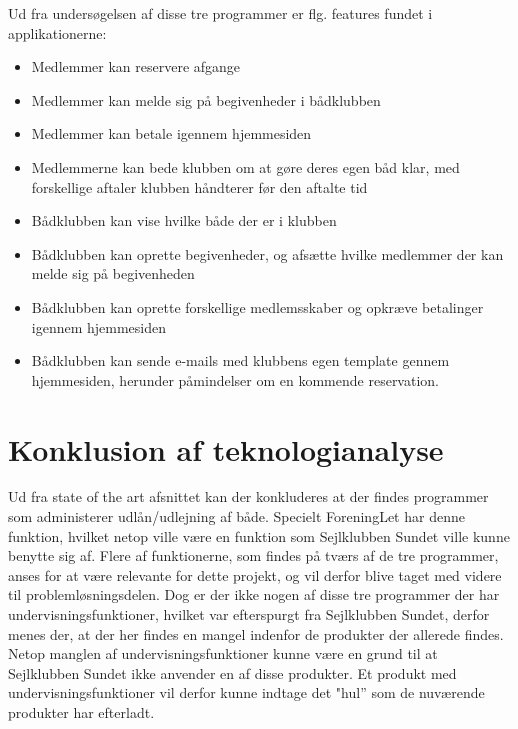Ud fra undersøgelsen af disse tre programmer er flg. features fundet i applikationerne:

\begin{itemize}
  \item Medlemmer kan reservere afgange
  \item Medlemmer kan melde sig på begivenheder i bådklubben
  \item Medlemmer kan betale igennem hjemmesiden
  \item Medlemmerne kan bede klubben om at gøre deres egen båd klar, med forskellige aftaler klubben håndterer
        før den aftalte tid
  \item Bådklubben kan vise hvilke både der er i klubben
  \item Bådklubben kan oprette begivenheder, og afsætte hvilke medlemmer der kan melde sig på begivenheden
  \item Bådklubben kan oprette forskellige medlemsskaber og opkræve betalinger igennem hjemmesiden
  \item Bådklubben kan sende e-mails med klubbens egen template gennem hjemmesiden, herunder påmindelser om en
        kommende reservation.
\end{itemize}
\section{Konklusion af teknologianalyse}

Ud fra state of the art afsnittet kan der konkluderes at der findes programmer som administerer udlån/udlejning af både.
Specielt ForeningLet har denne funktion, hvilket netop ville være en funktion som Sejlklubben Sundet ville kunne benytte sig af.
Flere af funktionerne, som findes på tværs af de tre programmer, anses for at være relevante for dette projekt, og vil derfor blive taget med videre til problemløsningsdelen.
Dog er der ikke nogen af disse tre programmer der har undervisningsfunktioner, hvilket var efterspurgt fra Sejlklubben Sundet, derfor menes der, at der her findes en mangel indenfor de produkter der allerede findes.
Netop manglen af undervisningsfunktioner kunne være en grund til at Sejlklubben Sundet ikke anvender en af disse produkter.
Et produkt med undervisningsfunktioner vil derfor kunne indtage det "hul'' som de nuværende produkter har efterladt.

